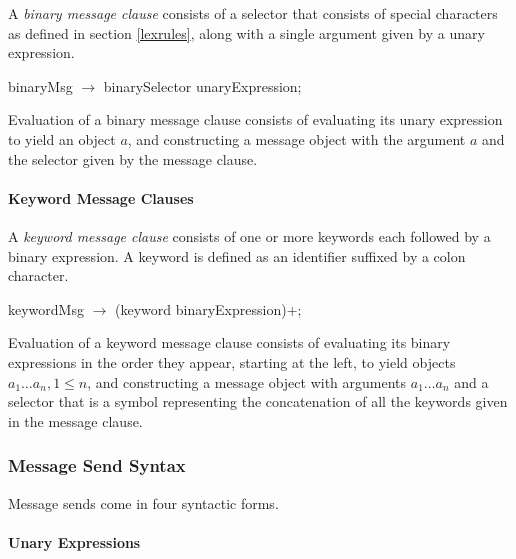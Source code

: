 \documentclass{article}
\begin{document}
A {\em binary message clause} consists of a selector that consists of special characters as defined in section \ref{lexrules}, along with a single argument given by a unary expression.

\begin{newspeak}
binaryMsg $\rightarrow$ binarySelector unaryExpression;
\end{newspeak}
Evaluation of a binary message clause consists of evaluating its unary expression to yield an object $a$, and constructing a message object with the argument $a$ and the selector given by the message clause.

\paragraph{Keyword Message Clauses}
\label{keywordMsg}

A {\em keyword message clause} consists of one or more keywords each followed by a binary expression. A keyword is defined as an identifier suffixed by a colon character.
\begin{newspeak}
 keywordMsg $\rightarrow$  (keyword binaryExpression)+;
\end{newspeak}
Evaluation of a keyword message clause consists of evaluating its binary expressions in the order they appear, starting at the left,  to yield objects $a_1 \ldots a_n, 1 \le n$, and constructing a message object with  arguments $a_1 \ldots a_n$ and a selector that is a symbol representing the concatenation of all the keywords given in the message clause.

\subsubsection{Message Send Syntax}

Message sends  come in four syntactic forms. 

\paragraph{Unary Expressions}
\label{unary}
\end{document}
